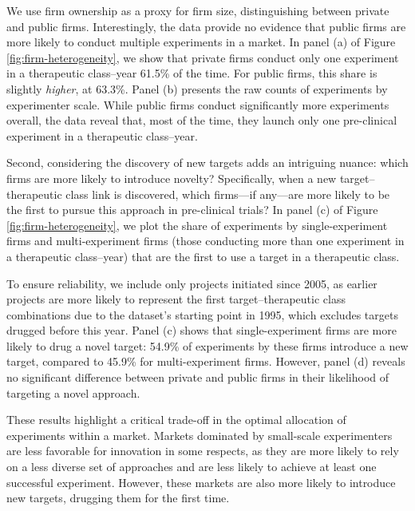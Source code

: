 We use firm ownership as a proxy for firm size, distinguishing between private and public firms. Interestingly, the data provide no evidence that public firms are more likely to conduct multiple experiments in a market. In panel (a) of Figure \ref{fig:firm-heterogeneity}, we show that private firms conduct only one experiment in a therapeutic class–year 61.5\% of the time. For public firms, this share is slightly \emph{higher}, at 63.3\%. Panel (b) presents the raw counts of experiments by experimenter scale. While public firms conduct significantly more experiments overall, the data reveal that, most of the time, they launch only one pre-clinical experiment in a therapeutic class–year.


Second, considering the discovery of new targets adds an intriguing nuance: which firms are more likely to introduce novelty? Specifically, when a new target–therapeutic class link is discovered, which firms—if any—are more likely to be the first to pursue this approach in pre-clinical trials? In panel (c) of Figure \ref{fig:firm-heterogeneity}, we plot the share of experiments by single-experiment firms and multi-experiment firms (those conducting more than one experiment in a therapeutic class–year) that are the first to use a target in a therapeutic class.

To ensure reliability, we include only projects initiated since 2005, as earlier projects are more likely to represent the first target–therapeutic class combinations due to the dataset’s starting point in 1995, which excludes targets drugged before this year. Panel (c) shows that single-experiment firms are more likely to drug a novel target: 54.9\% of experiments by these firms introduce a new target, compared to 45.9\% for multi-experiment firms. However, panel (d) reveals no significant difference between private and public firms in their likelihood of targeting a novel approach.

These results highlight a critical trade-off in the optimal allocation of experiments within a market. Markets dominated by small-scale experimenters are less favorable for innovation in some respects, as they are more likely to rely on a less diverse set of approaches and are less likely to achieve at least one successful experiment. However, these markets are also more likely to introduce new targets, drugging them for the first time.

